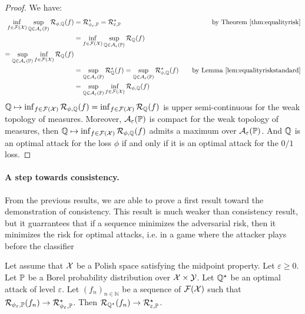 \begin{proof}
    We have:
    \begin{align*}
         \inf_{f\in\mathcal{F}(\mathcal{X})}\sup_{\mathbb{Q}\in\mathcal{A}_\varepsilon(\mathbb{P})} \mathcal{R}_{\phi,\mathbb{Q}}(f) &= \mathcal{R}_{\phi_\varepsilon,\mathbb{P}}^\star = \mathcal{R}_{\varepsilon,\mathbb{P}}^\star&\quad\text{by Theorem~\ref{thm:equalityrisk}} \\
         &=\inf_{f\in\mathcal{F}(\mathcal{X})}\sup_{\mathbb{Q}\in\mathcal{A}_\varepsilon(\mathbb{P})} \mathcal{R}_{\mathbb{Q}}(f) \\
         = \sup_{\mathbb{Q}\in\mathcal{A}_\varepsilon(\mathbb{P})} \inf_{f\in\mathcal{F}(\mathcal{X})}\mathcal{R}_{\mathbb{Q}}(f)\\
         &=\sup_{\mathbb{Q}\in\mathcal{A}_\varepsilon(\mathbb{P})} \mathcal{R}^\star_{\mathbb{Q}}(f) = \sup_{\mathbb{Q}\in\mathcal{A}_\varepsilon(\mathbb{P})} \mathcal{R}^\star_{\phi,\mathbb{Q}}(f)&\quad\text{by Lemma~\ref{lem:equalityriskstandard}}\\
        & =  \sup_{\mathbb{Q}\in\mathcal{A}_\varepsilon(\mathbb{P})}\inf_{f\in\mathcal{F}(\mathcal{X})} \mathcal{R}_{\phi,\mathbb{Q}}(f)\\
    \end{align*}
 $\mathbb{Q}\mapsto\inf_{f\in\mathcal{F}(\mathcal{X})}\mathcal{R}_{\phi,\mathbb{Q}}(f) =\inf_{f\in\mathcal{F}(\mathcal{X})}\mathcal{R}_{\mathbb{Q}}(f)  $ is  upper semi-continuous for the weak topology of measures. Moreover, $\mathcal{A}_\varepsilon(\mathbb{P})$ is compact for the weak topology of measures, then $\mathbb{Q}\mapsto\inf_{f\in\mathcal{F}(\mathcal{X})}\mathcal{R}_{\phi,\mathbb{Q}}(f)$ admits a maximum over  $\mathcal{A}_\varepsilon(\mathbb{P})$. And  $\mathbb{Q}$ is an optimal attack for the loss $\phi$  if and only if it is an optimal attack for the $0/1$ loss.
    \end{proof}
    

\paragraph{A step towards consistency.} From the previous results, we are able to prove a first result toward the demonstration of consistency. This result is much weaker than consistency result, but it guarrantees that if a sequence minimizes the adversarial risk, then it minimizes the risk for optimal attacks, i.e. in a game where the attacker plays before the classifier
\begin{prop}
\label{prop:pseudo}
Let assume that $\mathcal{X}$ be a Polish space satisfying the midpoint property. Let $\varepsilon\geq 0$. Let $\mathbb{P}$ be a Borel probability distribution over $\mathcal{X}\times\mathcal{Y}$.  Let $\mathbb{Q}^\star$ be an optimal attack of level $\varepsilon$. Let $(f_n)_{n\in\mathbb{N}}$ be a sequence of $\mathcal{F}(\mathcal{X})$ such that $\mathcal{R}_{\phi_\varepsilon,\mathbb{P}}(f_n)\to\mathcal{R}_{\phi_\varepsilon,\mathbb{P}}^\star$. Then $\mathcal{R}_{\mathbb{Q}^\star}(f_n)\to\mathcal{R}_{\varepsilon,\mathbb{P}}^\star$.
\end{prop}

